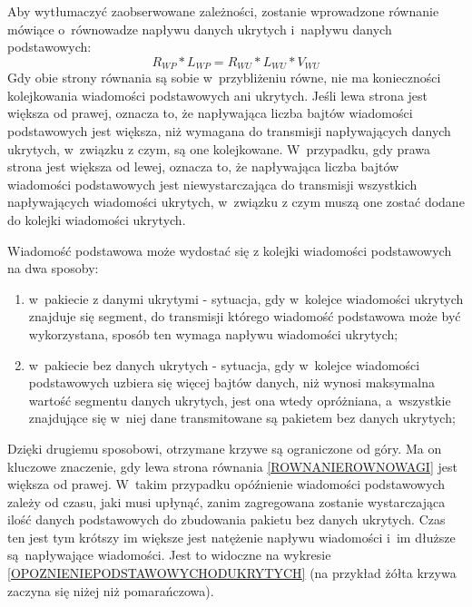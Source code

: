 \documentclass[a4paper, twoside, 12pt]{report}
\begin{document}
            Aby wytłumaczyć zaobserwowane zależności, zostanie wprowadzone równanie
            mówiące o~równowadze napływu danych ukrytych i~napływu danych podstawowych:
            \begin{equation} \label{ROWNANIEROWNOWAGI}
            R_{WP} * L_{WP} = R_{WU} * L_{WU} * V_{WU}
            \end{equation}
            Gdy obie strony równania są sobie w~przybliżeniu równe, nie ma konieczności
            kolejkowania wiadomości podstawowych ani ukrytych. Jeśli lewa strona jest
            większa od prawej, oznacza to, że napływająca liczba bajtów wiadomości podstawowych
            jest większa, niż wymagana do transmisji napływających danych ukrytych,
            w~związku z czym, są one kolejkowane. W~przypadku, gdy prawa strona jest
            większa od lewej, oznacza to, że napływająca liczba bajtów wiadomości
            podstawowych jest niewystarczająca do transmisji wszystkich napływających
            wiadomości ukrytych, w~związku z czym muszą one zostać dodane do kolejki
            wiadomości ukrytych.

            Wiadomość podstawowa może wydostać się z kolejki wiadomości podstawowych
            na dwa sposoby:
            \begin{enumerate}
                \item w~pakiecie z danymi ukrytymi - sytuacja, gdy w~kolejce
                    wiadomości ukrytych znajduje się segment, do transmisji którego
                    wiadomość podstawowa może być wykorzystana, sposób ten wymaga
                    napływu wiadomości ukrytych;
                \item w~pakiecie bez danych ukrytych - sytuacja, gdy w~kolejce wiadomości
                    podstawowych uzbiera się więcej bajtów danych, niż wynosi
                    maksymalna wartość segmentu danych ukrytych, jest ona wtedy
                    opróżniana, a~wszystkie znajdujące się w~niej dane transmitowane
                    są pakietem bez danych ukrytych;
            \end{enumerate}

            Dzięki drugiemu sposobowi, otrzymane krzywe są ograniczone od góry.
            Ma on kluczowe znaczenie, gdy lewa strona równania \ref{ROWNANIEROWNOWAGI} jest większa od prawej.
            W~takim przypadku
            opóźnienie wiadomości podstawowych zależy od czasu, jaki musi upłynąć,
            zanim zagregowana zostanie wystarczająca ilość danych podstawowych do zbudowania pakietu bez danych ukrytych.
            Czas ten jest tym krótszy im większe jest natężenie napływu wiadomości
            i~im dłuższe są napływające wiadomości. Jest to widoczne na wykresie
            \ref{OPOZNIENIEPODSTAWOWYCHODUKRYTYCH} (na przykład żółta krzywa zaczyna
            się niżej niż pomarańczowa).
\end{document}

